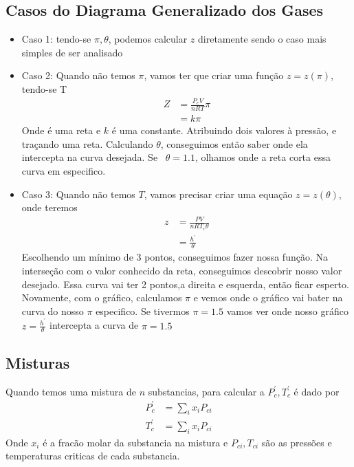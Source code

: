\subsection{Casos do Diagrama Generalizado dos Gases}
\begin{itemize}
    \item Caso 1: tendo-se \(\pi, \theta \), podemos calcular \(z\) diretamente sendo o caso mais simples de
    ser analisado
    \item Caso 2: Quando não temos \(\pi\), vamos ter que criar uma função \(z=z(\pi)\), tendo-se T
    \begin{align}
        Z&=\frac{P_cV}{nRT}\pi\\
        &=k\pi
    \end{align}
    Onde é uma reta e \(k\) é uma constante. Atribuindo dois valores à pressão, e traçando uma reta.
    Calculando \(\theta\), conseguimos então saber onde ela intercepta na curva desejada.
    Se \ \(\theta=1.1\), olhamos onde a reta corta essa curva em especifico.

    \item  Caso 3: Quando não temos \(T\), vamos precisar criar uma equação \(z=z(\theta)\), onde teremos
    \begin{align}
        z&=\frac{PV}{nRT_c \theta}\\
        &=\frac{h^\prime}{\theta}
    \end{align}
    Escolhendo um mínimo de 3 pontos, conseguimos fazer nossa função. Na interseção com o valor
    conhecido da reta, conseguimos descobrir nosso valor desejado. Essa curva vai ter 2 pontos,a direita
    e esquerda, então ficar esperto. Novamente, com o gráfico, calculamos \(\pi\) e vemos onde o gráfico
    vai bater na curva do nosso \(\pi\) especifico. Se tivermos \(\pi=1.5\) vamos ver onde nosso gráfico
    \(z=\frac{h^\prime}{\theta}\) intercepta a curva de \(\pi=1.5\)
\end{itemize}
\subsection{Misturas}
Quando temos uma mistura de \(n\) substancias, para calcular a \(P_c^\prime,T_c^\prime\) é dado por
\begin{align}
    P_c^\prime&=\sum_i x_i P_{ci}\\
    T_c^ \prime&= \sum_i x_i P_{ci}
\end{align}
Onde \(x_i\) é a fracão molar da substancia na mistura e \(P_{ci}, T_{ci}\) são as pressões e
temperaturas criticas de cada substancia.
